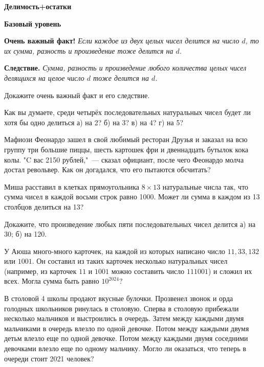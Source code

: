 \hspace{3mm}

\centerline{\bf \Huge Делимость+остатки}

\centerline{\bf \large Базовый уровень}

\begin{flushright}
        \scriptsize{}
\end{flushright}

\textbf{Очень важный факт!} \textit{Если каждое из двух целых чисел делится на число $d$, то их сумма, разность и произведение тоже делится на $d$.}

\textbf{Следствие.} \textit{Сумма, разность и произведение любого количества целых чисел делящихся на целое число $d$ тоже делится на $d$.}

Докажите очень важный факт и его следствие.

 Как вы думаете, среди четырёх последовательных натуральных чисел будет ли хотя бы одно делиться  а) на 2?  б) на 3?  в) на 4?  г) на 5?


Мафиози Феонардо зашел в свой любимый ресторан Друзья и заказал на всю группу три большие пиццы, шесть картошек фри и двеннадцать бутылок кока колы. "C вас 2150 рублей,"\ --- сказал официант, после чего Феонардо молча достал револьвер. Как он догадался, что его пытаются обсчитать? 

Миша расставил в клетках прямоугольника $8\times13$ натуральные числа так, что сумма чисел в каждой восьми строк равно 1000. Может ли сумма в каждом из 13 столбцов делиться на 13?

Докажите, что произведение любых пяти последовательных чисел делится а) на 30; б) на 120.

У Аюша много-много карточек, на каждой из которых написано число $11, 33, 132$ или $1001$. Он составил из таких карточек несколько натуральных чисел (например, из карточек $11$ и $1001$ можно составить число $111001$) и сложил их всех. Могла сумма быть равно $10^{2024}$?

В столовой 4 школы продают вкусные булочки. Прозвенел звонок и орда голодных школьников ринулась в столовую. Сперва в столовую прибежали несколько мальчиков и выстроились в очередь. Затем между каждыми двумя мальчиками в очередь влезло по одной девочке. Потом между каждыми двумя детьм влезло еще по одной девочке. Потом между каждыми двумя соседними девочками влезло еще по одному мальчику. Могло ли оказаться, что теперь в очереди стоит 2021 человек?


